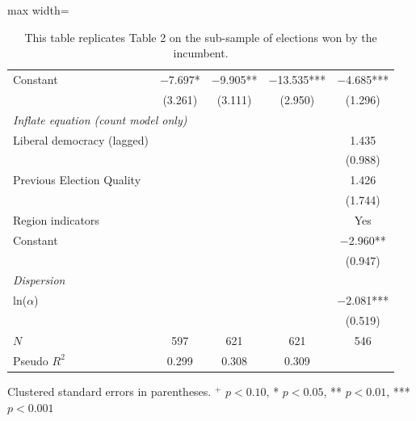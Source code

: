 \documentclass[USletter,12pt, titlepage]{article} %
\begin{document}
\begin{table}[H]
\begin{adjustbox}{max width=\textwidth}
\begin{threeparttable}
\begin{tabular}{lcccc}
Constant & $-$7.697* & $-$9.905** & $-$13.535*** & $-$4.685*** \\
 & (3.261) & (3.111) & (2.950) & (1.296) \\
\midrule
\multicolumn{5}{l}{\textit{Inflate equation (count model only)}} \\
\midrule
Liberal democracy (lagged) & & & & 1.435 \\
 & & & & (0.988) \\
Previous Election Quality & & & & 1.426 \\
 & & & & (1.744) \\
Region indicators & & & & Yes \\
Constant & & & & $-$2.960** \\
 & & & & (0.947) \\
\midrule
\multicolumn{5}{l}{\textit{Dispersion}} \\
\midrule
ln($\alpha$) & & & & $-$2.081*** \\
 & & & & (0.519) \\
\midrule
$N$ & 597 & 621 & 621 & 546 \\
Pseudo $R^{2}$ & 0.299 & 0.308 & 0.309 & \\
\bottomrule
\end{tabular}
\begin{tablenotes}
\small
\item Clustered standard errors in parentheses. $^{+}$ $p<0.10$, * $p<0.05$, ** $p<0.01$, *** $p<0.001$
\end{tablenotes}
\end{threeparttable}
\end{adjustbox}
\vspace{0.5em}
\caption{This table replicates Table 2 on the sub-sample of elections won by the incumbent.}
\end{table}
\end{document}
